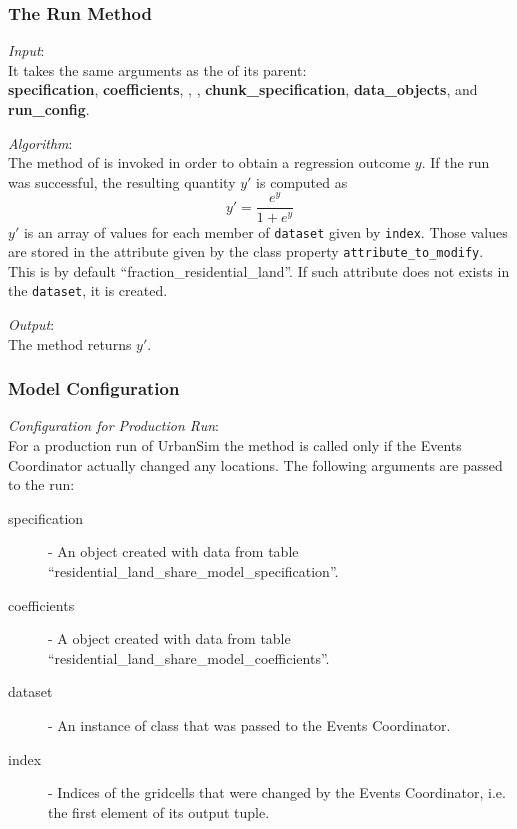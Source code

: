 \subsubsection{The Run Method}
%
{\it Input}:\\[1mm]
It takes the same arguments as the  of its parent: \\
{\bf specification}, {\bf coefficients}, , , {\bf
  chunk_specification}, {\bf data_objects}, and {\bf run_config}.

{\it Algorithm}:\\[1mm]
The  method of  \modelsindex is invoked in order to
obtain a regression outcome $y$. If the run
was successful, the resulting quantity $y'$ is computed as
\[
y' = \frac{e^y}{1+e^y}
\]
$y'$ is an array of values for each member of \verb|dataset| \datasetindex given by
\verb|index|. Those values are stored in the attribute \attributesindex given by the class
property \verb|attribute_to_modify|. This is by default
``fraction_residential_land''. If such attribute \attributesindex does not exists in the
\verb|dataset|, \datasetindex it is created.

{\it Output}:\\[1mm]
The method returns $y'$.

\subsubsection{Model Configuration}
\modelsindex
%
{\em Configuration for Production Run}:\\[1mm]
For a production run of UrbanSim the method  is called only if
the Events Coordinator actually changed any locations.  The following
arguments are passed to the run:
\begin{description}
\item[specification] -  An
 object created with data from table
``residential_land_share_model_specification''. \modelsindex
\item[coefficients] - A  object created
with data from table ``residential_land_share_model_coefficients''. \coefficientsindex\modelsindex
\item[dataset] - An instance of class  that was passed to
  the Events Coordinator.
\item[index] - Indices of the gridcells that were changed by the Events
  Coordinator, i.e. the first element of its output tuple.
\end{description}

